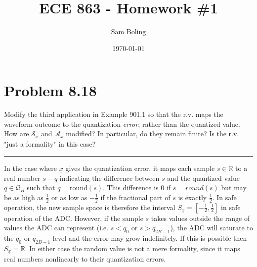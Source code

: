 \documentclass{article}
\title{ECE 863 - Homework \#1}
\author{Sam Boling}
\date{\today}
\newcommand{\horline}
           {\begin{center}
              \noindent\rule{8cm}{0.4pt}
            \end{center}}
\begin{document}
\maketitle

\section*{Problem 8.18}
Modify the third application in Example 901.1 so that the r.v. maps the 
waveform outcome to the quantization \textit{error}, rather than the 
quantized value. How are $\mathcal{S}_{\underline{x}}$ and 
$\mathcal{A}_{\underline{x}}$ modified? In particular, do they remain
finite? Is the r.v. "just a formality" in this case?
\horline
In the case where $\underline{x}$ gives the quantization error, it maps each
sample $s \in \mathbb{R}$ to a real number $s-q$ indicating the difference 
between $s$ and the quantized value $q \in \mathcal{Q}_B$ such that 
$q = \mathrm{round}(s)$. This difference is 0 if $s = round(s)$ but may be
as high as $\frac{1}{2}$ or as low as $-\frac{1}{2}$ if the fractional part
of $s$ is exactly $\frac{1}{2}$. In safe operation, the new sample space is
therefore the interval 
$S_{\underline{x}} = \left[-\frac{1}{2}, \frac{1}{2}\right]$ in safe 
operation of the ADC. However, if the sample $s$ takes values outside the
range of values the ADC can represent (i.e. $s < q_0$ or $s > q_{2B-1}$),
the ADC will saturate to the $q_0$ or $q_{2B-1}$ level and the error may 
grow indefinitely. If this is possible then 
$S_{\underline{x}} = \mathbb{R}$. In either case the random value is not a
mere formality, since it maps real numbers nonlinearly to their quantization
errors.

\pagebreak
\end{document}

